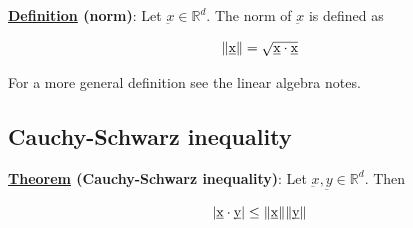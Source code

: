 \documentclass[10pt]{extarticle}
\newcommand{\R}{\mathbb{R}}
\begin{document}
\textbf{\underline{Definition} (norm)}: Let $\underbar{x} \in \R^d$. The norm of $\underbar{x}$ is defined as

$$
    \norm{\underbar{x}} = \sqrt{\underbar{x} \cdot \underbar{x}}
$$

For a more general definition see the linear algebra notes.

\subsection{Cauchy-Schwarz inequality}

\textbf{\underline{Theorem} (Cauchy-Schwarz inequality)}: Let $\underbar{x}, \underbar{y} \in \R^d$. Then

$$
    \abs{\underbar{x} \cdot \underbar{y}} \leq \norm{\underbar{x}} \norm{\underbar{y}}
$$
\end{document}

